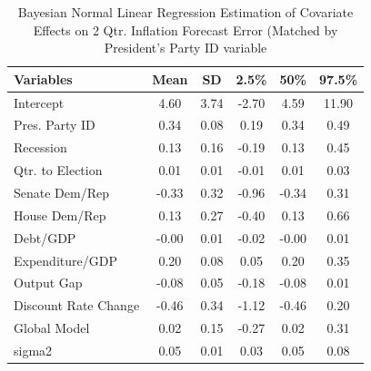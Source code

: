 \documentclass[a4paper]{article}\usepackage{graphicx, color}
\begin{document}
\begin{table}[ht]
\begin{center}
\caption{Bayesian Normal Linear Regression Estimation of Covariate Effects on 2 Qtr. Inflation Forecast Error (Matched by President's Party ID variable}
\label{OutputPB}
{\small
\begin{tabular}{lccccc}
  \hline
Variables & Mean & SD & 2.5\% & 50\% & 97.5\% \\ 
  \hline
Intercept & 4.60 & 3.74 & -2.70 & 4.59 & 11.90 \\ 
  Pres. Party ID & 0.34 & 0.08 & 0.19 & 0.34 & 0.49 \\ 
  Recession & 0.13 & 0.16 & -0.19 & 0.13 & 0.45 \\ 
  Qtr. to Election & 0.01 & 0.01 & -0.01 & 0.01 & 0.03 \\ 
  Senate Dem/Rep & -0.33 & 0.32 & -0.96 & -0.34 & 0.31 \\ 
  House Dem/Rep & 0.13 & 0.27 & -0.40 & 0.13 & 0.66 \\ 
  Debt/GDP & -0.00 & 0.01 & -0.02 & -0.00 & 0.01 \\ 
  Expenditure/GDP & 0.20 & 0.08 & 0.05 & 0.20 & 0.35 \\ 
  Output Gap & -0.08 & 0.05 & -0.18 & -0.08 & 0.01 \\ 
  Discount Rate Change & -0.46 & 0.34 & -1.12 & -0.46 & 0.20 \\ 
  Global Model & 0.02 & 0.15 & -0.27 & 0.02 & 0.31 \\ 
  sigma2 & 0.05 & 0.01 & 0.03 & 0.05 & 0.08 \\ 
   \hline
\end{tabular}
}
\end{center}
\end{table}
\end{document}
